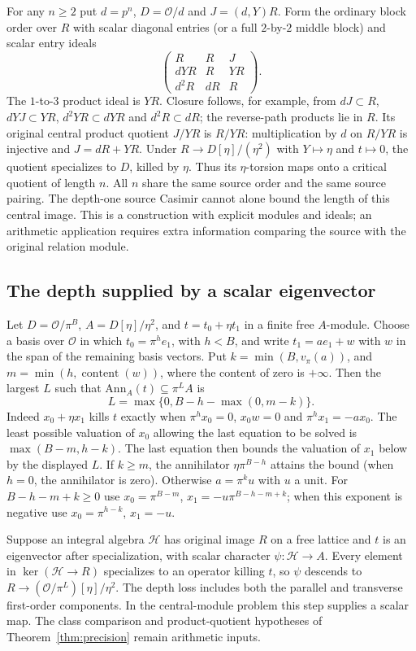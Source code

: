 \documentclass[11pt]{article}
\newcommand{\OO}{\mathcal O}
\begin{document}
For any $n\ge2$ put $d=p^n$, $D=\OO/d$ and $J=(d,Y)R$. Form the
ordinary block order over $R$ with scalar diagonal entries
(or a full $2$-by-$2$ middle block) and scalar entry ideals
\[
 \begin{pmatrix}
 R & R & J\\
 dYR & R & YR\\
 d^2R & dR & R
 \end{pmatrix}.
\]
The $1$-to-$3$ product ideal is $YR$. Closure follows, for example,
from $dJ\subset R$, $dYJ\subset YR$, $d^2YR\subset dYR$ and
$d^2R\subset dR$; the reverse-path products lie in $R$.
Its original central product quotient $J/YR$ is $R/YR$:
multiplication by $d$ on $R/YR$ is injective and $J=dR+YR$.
Under $R\to D[\eta]/(\eta^2)$ with $Y\mapsto\eta$ and $t\mapsto0$,
the quotient specializes to $D$, killed by $\eta$. Thus its
$\eta$-torsion maps onto a critical quotient of length $n$.
All $n$ share the same source order and the same source pairing.
The depth-one source Casimir cannot alone bound the length of this
central image. This is a construction with explicit modules and ideals;
an arithmetic application requires extra information comparing the
source with the original relation module.

\subsection{The depth supplied by a scalar eigenvector}
Let $D=\OO/\pi^B$, $A=D[\eta]/\eta^2$, and $t=t_0+\eta t_1$ in
a finite free $A$-module. Choose a basis over $\OO$ in which
$t_0=\pi^h e_1$, with $h<B$, and write
$t_1=a e_1+w$ with $w$ in the span of the remaining basis vectors.
Put $k=\min(B,v_\pi(a))$, and
$m=\min(h,\operatorname{content}(w))$, where the content of zero is
$+\infty$. Then the largest $L$ such that
$\mathrm{Ann}_A(t)\subseteq\pi^L A$ is
\[
 L=\max\{0,B-h-\max(0,m-k)\}.
\]
Indeed $x_0+\eta x_1$ kills $t$ exactly when $\pi^h x_0=0$,
$x_0w=0$ and $\pi^h x_1=-a x_0$. The least possible valuation of
$x_0$ allowing the last equation to be solved is
$\max(B-m,h-k)$. The last equation then bounds the valuation of
$x_1$ below by the displayed $L$. If $k\ge m$, the annihilator
$\eta\pi^{B-h}$ attains the bound (when $h=0$, the annihilator is zero).
Otherwise $a=\pi^k u$ with $u$ a unit. For $B-h-m+k\ge0$ use
$x_0=\pi^{B-m}$, $x_1=-u\pi^{B-h-m+k}$; when this exponent is
negative use $x_0=\pi^{h-k}$, $x_1=-u$.

Suppose an integral algebra $\mathcal H$ has original image $R$
on a free lattice and $t$ is an eigenvector after specialization,
with scalar character $\psi:\mathcal H\to A$. Every element in
$\ker(\mathcal H\to R)$ specializes to an operator killing $t$,
so $\psi$ descends to $R\to (\OO/\pi^L)[\eta]/\eta^2$.
The depth loss includes both the parallel and transverse first-order
components. In the central-module problem this step supplies a scalar
map. The class comparison and product-quotient hypotheses of
Theorem~\ref{thm:precision} remain arithmetic inputs.
\end{document}
